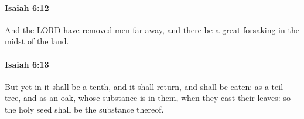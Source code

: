		\paragraph{Isaiah 6:12} %
			\label{ISAIAH-6-12}

			And the LORD have removed men far away, and there be a great forsaking in the midst of the land.


		\paragraph{Isaiah 6:13} %
			\label{ISAIAH-6-13}

			But yet in it shall be a tenth, and it shall return, and shall be eaten: as a teil tree, and as an oak, whose substance is in them, when they cast their leaves: so the holy seed shall be the substance thereof.

